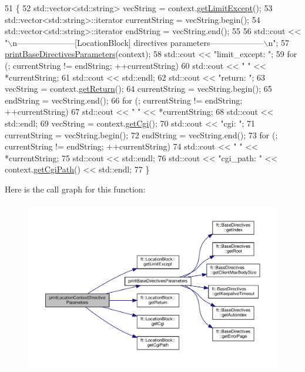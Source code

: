 \begin{DoxyCode}
51     \{
52         std::vector<std::string>        vecString = context.\hyperlink{classft_1_1_location_block_ad2dc75d3f9c9f06f31e3948823557d52}{getLimitExcept}();
53         std::vector<std::string>::iterator  currentString = vecString.begin();
54         std::vector<std::string>::iterator      endString = vecString.end();
55 
56         std::cout << \textcolor{stringliteral}{"\(\backslash\)n---------------------[LocationBlock] directives parameters--------------------\(\backslash\)n"};
57         \hyperlink{classft_1_1_print_config_ad71821d54e46c04a81d26dbabd3c4b20}{printBaseDirectivesParameters}(context);
58         std::cout << \textcolor{stringliteral}{"limit\_except: "};
59         \textcolor{keywordflow}{for} (; currentString != endString; ++currentString)
60             std::cout << \textcolor{stringliteral}{" "} << *currentString;
61         std::cout << std::endl;
62         std::cout << \textcolor{stringliteral}{"return: "};
63         vecString = context.\hyperlink{classft_1_1_location_block_aeef5e4710c02406c46e54d4aa0c8f57c}{getReturn}();
64         currentString = vecString.begin();
65         endString = vecString.end();
66         \textcolor{keywordflow}{for} (; currentString != endString; ++currentString)
67             std::cout << \textcolor{stringliteral}{" "} << *currentString;
68         std::cout << std::endl;
69         vecString = context.\hyperlink{classft_1_1_location_block_adc8c829b27e09893233983eb1c727755}{getCgi}();
70         std::cout << \textcolor{stringliteral}{"cgi: "};
71         currentString = vecString.begin();
72         endString = vecString.end();
73         \textcolor{keywordflow}{for} (; currentString != endString; ++currentString)
74             std::cout << \textcolor{stringliteral}{" "} << *currentString;
75         std::cout << std::endl;
76         std::cout << \textcolor{stringliteral}{"cgi\_path: "} << context.\hyperlink{classft_1_1_location_block_a9f90dac2d6314b77ccb9c9d4ab2a3fa4}{getCgiPath}() << std::endl;
77     \}
\end{DoxyCode}
Here is the call graph for this function\+:
\nopagebreak
\begin{figure}[H]
\begin{center}
\leavevmode
\includegraphics[width=350pt]{classft_1_1_print_config_a8862bb68558be4a7286c6ce05db3fa4d_cgraph}
\end{center}
\end{figure}
